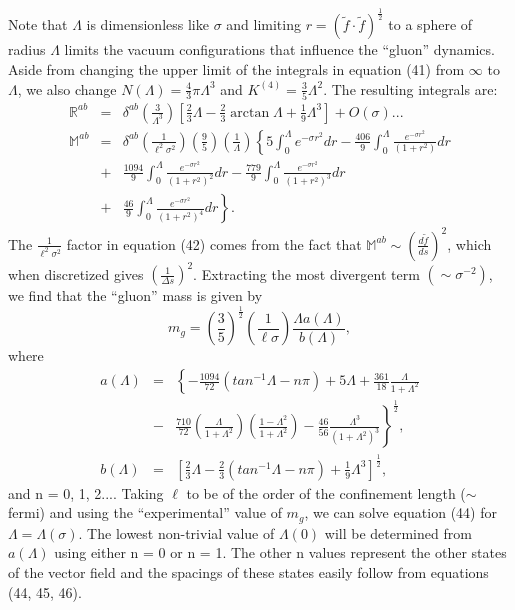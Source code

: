 \documentclass[a4paper,12pt]{article}
\begin{document}
Note that $\Lambda$ is dimensionless like $\sigma$ and limiting $r=(\tilde{f}\cdot\tilde{f})^{\frac{1}{2}}$ to a sphere of radius $\Lambda$ limits the vacuum configurations that influence the ``gluon'' dynamics.  Aside from changing the upper limit of the integrals in equation (41) from $\infty$ to $\Lambda$, we also change $N(\Lambda) =\frac{4}{3}\pi\Lambda^{3}$ and $K^{(4)}=\frac{3}{5}\Lambda^{2}$.  The resulting integrals are:
\begin{eqnarray}\label{26}
\mathbb{R}^{ab}
&=& \delta^{ab}(\frac{3}{\Lambda^{3}})
 [\frac{2}{3}\Lambda-\frac{2}{3}\arctan\Lambda +\frac{1}{9}\Lambda^{3}]
 +O(\sigma)...\nonumber\\
\mathbb{M}^{ab}
&=& \delta^{ab}(\frac{1}{\ell^{2}\sigma^{2}})(\frac{9}{5})(\frac{1}{\Lambda})
  \left\{
    5\int^{\Lambda}_{0}e^{-\sigma r^{2}}dr
    -\frac{406}{9}\int^{\Lambda}_{0}\frac{e^{-\sigma r^{2}}}{(1+r^2)}dr
  \right.\nonumber\\
&+& \frac{1094}{9}\int^{\Lambda}_{0}\frac{e^{-\sigma r^{2}}}{(1+r^{2})^{2}}dr-  \frac{779}{9}\int^{\Lambda}_{0}\frac{e^{-\sigma r^{2}}}{(1+r^{2})^{3}}dr
\nonumber\\
&+&
 \left.
   \frac{46}{9}\int^{\Lambda}_{0}\frac{e^{-\sigma r^{2}}}{(1+r^{2})^{4}}dr
 \right\}.
\end{eqnarray}
The $\frac{1}{\ell^{2}\sigma^{2}}$ factor in equation (42) comes from the fact that $\mathbb{M}^{ab}\sim(\frac{d\tilde{f}}{ds})^{2}$, which when discretized gives $(\frac{1}{\Delta s})^{2}$.  Extracting the most divergent term $(\sim\sigma^{-2})$, we find that the ``gluon'' mass is given by
\begin{equation}\label{27}
m_{g}
 =(\frac{3}{5})^{\frac{1}{2}}(\frac{1}{\ell\sigma})\frac{\Lambda a(\Lambda)}{b(\Lambda)},
\end{equation}
where
\begin{eqnarray}\label{28}
a(\Lambda)
&=&
   \left\{
     - \frac{1094}{72}(tan^{-1}\Lambda-n\pi)+5\Lambda 
     + \frac{361}{18}\frac{\Lambda}{1+\Lambda^{2}}
   \right.\nonumber\\
&-&
  \left.
     \frac{710}{72}(\frac{\Lambda}{1+\Lambda^{2}})(\frac{1-\Lambda^{2}}{1+\Lambda^{2}}) 
     -\frac{46}{56}\frac{\Lambda^{3}}{(1+\Lambda^{2})^{3}}
  \right\} ^{\frac{1}{2}},\\
b(\Lambda)
&=&
  \left[
     \frac{2}{3}\Lambda-\frac{2}{3}(tan^{-1}
     \Lambda-n\pi)+\frac{1}{9}\Lambda^{3}
  \right] ^{\frac{1}{2}},
\end{eqnarray}
and n = 0, 1, 2....  Taking $\ell$ to be of the order of the confinement length ($\sim$ fermi) and using the ``experimental'' value of $m_{g}$, we can solve equation (44) for $\Lambda=\Lambda(\sigma)$.  The lowest non-trivial value of $\Lambda(0)$ will be determined from $a(\Lambda)$ using either n = 0 or n = 1.  The other n values represent the other states of the vector field and the spacings of these states easily follow from equations (44, 45, 46).\\
\end{document}
